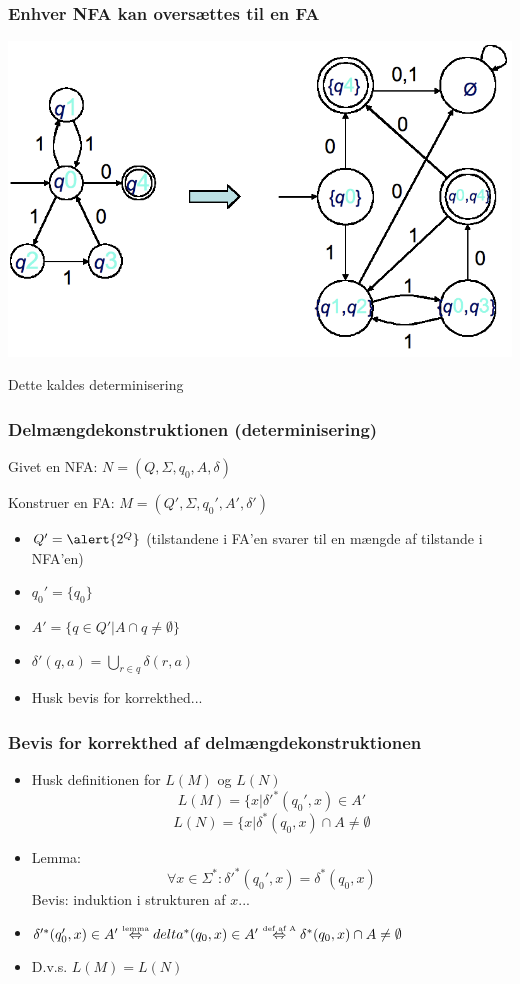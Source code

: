 \begin{frame}
\frametitle{Enhver NFA kan oversættes til en FA}
\begin{center}
  \includegraphics[scale=0.4]{images/2_seminar_convert}
\end{center}
\pause

Dette kaldes determinisering
\end{frame}

\begin{frame}
\frametitle{Delmængdekonstruktionen (determinisering)}
Givet en NFA: $N=(Q, \Sigma, q_0, A, \delta)$

Konstruer en FA: $M=(Q', \Sigma, q_0', A', \delta')$
\pause
\begin{itemize}[<+->]
\item $Q'=\alert{2^{Q}}$ (tilstandene i FA'en svarer til en mængde af tilstande i NFA'en)
\item $q_0' = \{q_0\}$
\item $A' = \{q \in Q' | A \cap q \neq \emptyset \}$
\item $\delta'(q, a) = \bigcup_{r\in q}\delta(r,a)$
\item Husk bevis for korrekthed...
\end{itemize}
\end{frame}
\begin{frame}
  \frametitle{Bevis for korrekthed af delmængdekonstruktionen}
\begin{itemize}[<+->]
\item Husk definitionen for $L(M)$ og $L(N)$
\[L(M) = \{x | \delta'^*(q_0', x) \in A'\]
\[L(N) = \{x | \delta^*(q_0, x) \cap A \neq \emptyset\]
\item Lemma:
\[\forall x\in \Sigma^*: \delta'^*(q_0', x) = \delta^*(q_0, x)\]
Bevis: induktion i strukturen af $x$...
\item $ \delta'^*(q_0', x) \in A' \overset{\text{\tiny{lemma}}}{\Leftrightarrow} 
delta^*(q_0, x) \in A' \overset{\text{\tiny{def af A}}}{\Leftrightarrow} \delta^*(q_0, x) \cap A \neq \emptyset$
\item D.v.s. $L(M)=L(N)$
\end{itemize}
\end{frame}

